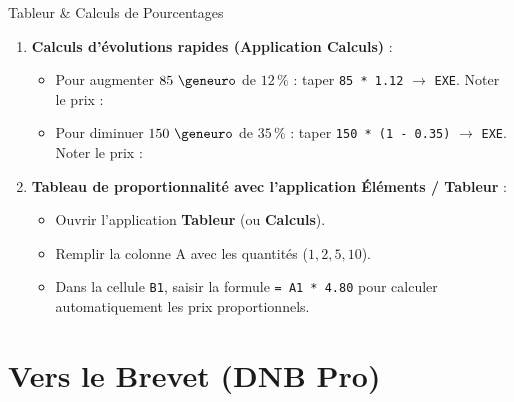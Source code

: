 \begin{tpinfo}{Tableur \& Calculs de Pourcentages}
\begin{enumerate}
    \item \textbf{Calculs d'évolutions rapides (Application Calculs)} :
    \begin{itemize}
        \item Pour augmenter $85\text{ \euro{}}$ de $12\,\%$ : taper \texttt{85 * 1.12} $\rightarrow$ \texttt{EXE}. Noter le prix : \pointille[3cm]
        \item Pour diminuer $150\text{ \euro{}}$ de $35\,\%$ : taper \texttt{150 * (1 - 0.35)} $\rightarrow$ \texttt{EXE}. Noter le prix : \pointille[3cm]
    \end{itemize}
    \item \textbf{Tableau de proportionnalité avec l'application Éléments / Tableur} :
    \begin{itemize}
        \item Ouvrir l'application \textbf{Tableur} (ou \textbf{Calculs}).
        \item Remplir la colonne A avec les quantités ($1, 2, 5, 10$).
        \item Dans la cellule \texttt{B1}, saisir la formule \texttt{= A1 * 4.80} pour calculer automatiquement les prix proportionnels.
    \end{itemize}
\end{enumerate}
\end{tpinfo}

\section{Vers le Brevet (DNB Pro)}

